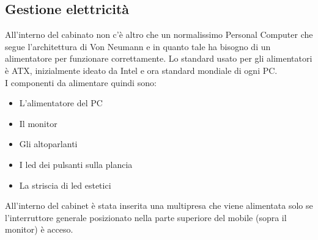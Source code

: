 \subsection{Gestione elettricità}
All’interno del cabinato non c’è altro che un normalissimo Personal Computer che segue l'architettura di Von Neumann e in quanto tale ha bisogno di un alimentatore per funzionare correttamente. Lo standard usato per gli alimentatori è ATX, inizialmente ideato da Intel e ora standard mondiale di ogni PC.\\
I componenti da alimentare quindi sono:\\
\begin{itemize}
\item L’alimentatore del PC
\item Il monitor
\item Gli altoparlanti
\item I led dei pulsanti sulla plancia
\item La striscia di led estetici
\end{itemize}
All’interno del cabinet è stata inserita una multipresa che viene alimentata solo se l’interruttore generale posizionato nella parte superiore del mobile (sopra il monitor) è acceso.

